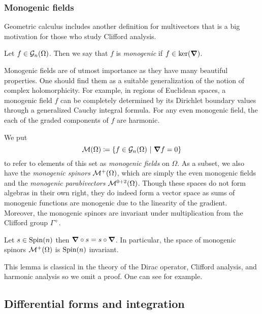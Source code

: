 \subsubsection{Monogenic fields}

Geometric calculus includes another definition for multivectors that is a big motivation for those who study Clifford analysis. 
\begin{definition}
 Let $f \in \mathcal{G}_n(\Omega)$. Then we say that $f$ is \emph{monogenic} if $f \in \ker(\boldsymbol{\nabla})$.
\end{definition}

Monogenic fields are of utmost importance as they have many beautiful properties. One should find them as a suitable generalization of the notion of complex holomorphicity. For example, in regions of Euclidean spaces, a monogenic field $f$ can be completely determined by its Dirichlet boundary values through a generalized Cauchy integral formula. For any even monogenic field, the each of the graded components of $f$ are harmonic.  

We put 
\[
\mathcal{M}(\Omega) \coloneqq \{f \in \mathcal{G}_n(\Omega) ~\vert~ \boldsymbol{\nabla} f =0\}
\]
to refer to elements of this set as \emph{monogenic fields} on $\Omega$. As a subset, we also have the \emph{monogenic spinors} $\mathcal{M}^+(\Omega)$, which are simply the even monogenic fields and the \emph{monogenic parabivectors} $\mathcal{M}^{0+2}(\Omega)$. Though these spaces do not form algebras in their own right, they do indeed form a vector space as sums of monogenic functions are monogenic due to the linearity of the gradient.  Moreover, the monogenic spinors are invariant under multiplication from the Clifford group $\Gamma^+$.

\begin{lemma}
\label{lem:clifford_invariant}
Let $s\in \operatorname{Spin}(n)$ then $\boldsymbol{\nabla} \circ s = s \circ \boldsymbol{\nabla}$.  In particular, the space of monogenic spinors $\mathcal{M}^+(\Omega)$ is $\operatorname{Spin}(n)$ invariant.
\end{lemma}
This lemma is classical in the theory of the Dirac operator, Clifford analysis, and harmonic analysis so we omit a proof.  One can see \cite{janssens_special_nodate} for example.

\subsection{Differential forms and integration}
\label{subsec:diff_forms}

